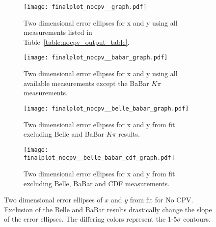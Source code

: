 \begin{figure}[htb]
  \begin{center}
    \begin{subfigure}[b]{0.4\textwidth}
      \centering
      \texttt{[image: finalplot\_nocpv\_\_graph.pdf]}
      \caption{Two dimensional error ellipses for x and y using all measurements listed in Table~\ref{table:nocpv_output_table}.}
      \label{fig:xy_no_cpv_}
    \end{subfigure}\hspace{3mm}%
    \begin{subfigure}[b]{0.4\textwidth}
      \centering
      \texttt{[image: finalplot\_nocpv\_\_babar\_graph.pdf]}
      \caption{Two dimensional error ellipses for x and y using all available measurements except the BaBar $K\pi$ measurements.}
      \label{fig:xy_no_cpv_no_babar}
    \end{subfigure}%
    
    \begin{subfigure}[b]{0.4\textwidth}
      \centering
      \texttt{[image: finalplot\_nocpv\_\_belle\_babar\_graph.pdf]}
      \caption{Two dimensional error ellipses for x and y from fit excluding Belle and BaBar $K\pi$ results.}
      \label{fig:xy_no_cpv_nobelle_babar}
    \end{subfigure}%
    \hspace{2mm}
    \begin{subfigure}[b]{0.4\textwidth}
      \centering
      \texttt{[image: finalplot\_nocpv\_\_belle\_babar\_cdf\_graph.pdf]}
      \caption{Two dimensional error ellipses for x and y from fit excluding Belle, BaBar and CDF measurements.}
      \label{fig:xy_no_cpv_nocdf}
    \end{subfigure}%
  \end{center}
  \caption{Two dimensional error ellipses of $x$ and $y$ from fit for No CPV. Exclusion of the Belle and BaBar results drastically change the slope of the error ellipses. The differing colors represent the 1-5$\sigma$ contours.}
  \label{fig:xy_nocpv_variations}
\end{figure}


